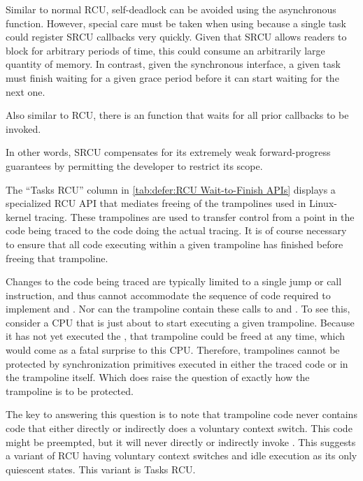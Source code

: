 Similar to normal RCU, self-deadlock can be avoided using the
asynchronous  function.
However, special care must be taken when using  because
a single task could register SRCU callbacks very quickly.
Given that SRCU allows readers to block for arbitrary periods of
time, this could consume an arbitrarily large quantity of memory.
In contrast, given the synchronous 
interface, a given task must finish waiting for a given grace period
before it can start waiting for the next one.

Also similar to RCU, there is an  function that waits
for all prior  callbacks to be invoked.

In other words, SRCU compensates for its extremely weak
forward-progress guarantees by permitting the developer to restrict
its scope.

The ``Tasks RCU'' column in
\cref{tab:defer:RCU Wait-to-Finish APIs} displays a specialized
RCU API that mediates freeing of the trampolines used in Linux-kernel
tracing.
These trampolines are used to transfer control from a point in the
code being traced to the code doing the actual tracing.
It is of course necessary to ensure that all code executing within
a given trampoline has finished before freeing that trampoline.

Changes to the code being traced are typically limited to a single jump
or call instruction, and thus cannot accommodate the sequence of code
required to implement  and .
Nor can the trampoline contain these calls to  and
.
To see this, consider a CPU that is just about to start executing a
given trampoline.
Because it has not yet executed the , that
trampoline could be freed at any time, which would come as a fatal
surprise to this CPU\@.
Therefore, trampolines cannot be protected by synchronization primitives
executed in either the traced code or in the trampoline itself.
Which does raise the question of exactly how the trampoline is to be
protected.

The key to answering this question is to note that trampoline code
never contains code that either directly or indirectly does a
voluntary context switch.
This code might be preempted, but it will never directly or indirectly
invoke .
This suggests a variant of RCU having voluntary context switches and
idle execution as its only quiescent states.
This variant is Tasks RCU\@.


